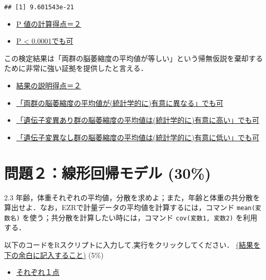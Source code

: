 \documentclass[11pt,]{problemset}
\newenvironment{Shaded}{\begin{snugshade}}{\end{snugshade}}
\newcommand{\CommentTok}[1]{\textcolor[rgb]{0.56,0.35,0.01}{\textit{#1}}}
\newcommand{\KeywordTok}[1]{\textcolor[rgb]{0.13,0.29,0.53}{\textbf{#1}}}
\newcommand{\NormalTok}[1]{#1}
\newcommand{\OperatorTok}[1]{\textcolor[rgb]{0.81,0.36,0.00}{\textbf{#1}}}
\begin{document}
\begin{verbatim}
## [1] 9.601543e-21
\end{verbatim}

\begin{itemize}
\item
  \underline{P 値の計算得点＝２}
\item
  \underline{P < 0.0001でも可}
\end{itemize}

この検定結果は「両群の脳萎縮度の平均値が等しい」という帰無仮説を棄却するために非常に強い証拠を提供したと言える．

\begin{itemize}
\item
  \underline{結果の説明得点＝２}
\item
  \underline{「両群の脳萎縮度の平均値が(統計学的に)有意に異なる」でも可}
\item
  \underline{「遺伝子変異あり群の脳萎縮度の平均値は(統計学的に)有意に高い」でも可}
\item
  \underline{「遺伝子変異なし群の脳萎縮度の平均値は(統計学的に)有意に低い」でも可}
\end{itemize}

\newpage

\hypertarget{-30}{%
\section{問題２：線形回帰モデル (30\%)}\label{-30}}

2.3
年齢，体重それぞれの平均値，分散を求めよ；また，年齢と体重の共分散を算出せよ．なお，EZRで計量データの平均値を計算するには，コマンド
\texttt{mean(変数名)} を使う；共分散を計算したい時には，コマンド
\texttt{cov(変数1,\ 変数2)} を利用する．

以下のコードをRスクリプトに入力して,実行をクリックしてください．\newline
\underline{(結果を下の余白に記入すること)} (5\%)

\begin{itemize}
\item
  \underline{それぞれ１点}
\end{itemize}

\begin{Shaded}
\end{Shaded}
\end{document}

